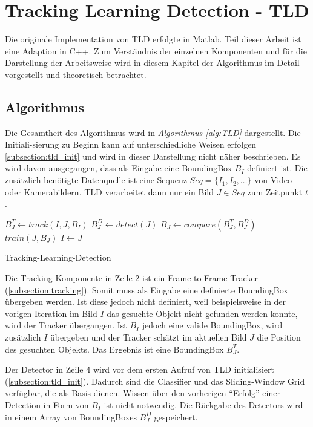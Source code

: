 \section{Tracking Learning Detection - TLD}
	\label{section_3}
	Die originale Implementation von TLD erfolgte in Matlab. Teil dieser Arbeit ist eine Adaption in C++. Zum Verständnis der einzelnen Komponenten und für die Darstellung der Arbeitsweise wird in diesem Kapitel der Algorithmus im Detail vorgestellt und theoretisch betrachtet.

	\subsection{Algorithmus}
	Die Gesamtheit des Algorithmus wird in {\em Algorithmus \ref{alg:TLD}} dargestellt. Die Initiali-sierung zu Beginn kann auf unterschiedliche Weisen erfolgen \ref{subsection:tld_init} und wird in dieser Darstellung nicht näher beschrieben. Es wird davon ausgegangen, dass als Eingabe eine BoundingBox $B_I$ definiert ist. Die zusätzlich benötigte Datenquelle ist eine Sequenz $Seq = \{I_1, I_2, \dots \}$ von Video- oder Kamerabildern. TLD verarbeitet dann nur ein Bild $J \in Seq$ zum Zeitpunkt $t$.

	\begin{algorithm}[H]
		\vspace{0.2cm}
		 {
			$B_J^T \leftarrow track(I,J,B_I)$\;
		}
		$B_J^D \leftarrow detect(J)$\;
		$B_J \leftarrow compare(B_J^T,B_J^D)$\;
		 {
			$train(J,B_J)$\;
		}
		$I \leftarrow J$\;
		\caption{Tracking-Learning-Detection}
		\label{alg:TLD}
		\vspace{0.2cm}
	\end{algorithm}
	Die Tracking-Komponente in Zeile 2 ist ein Frame-to-Frame-Tracker (\ref{subsection:tracking}). Somit muss als Eingabe eine definierte BoundingBox übergeben werden. Ist diese jedoch nicht definiert, weil beispielsweise in der vorigen Iteration im Bild $I$ das gesuchte Objekt nicht gefunden werden konnte, wird der Tracker übergangen. Ist $B_I$ jedoch eine valide BoundingBox, wird zusätzlich $I$ übergeben und der Tracker schätzt im aktuellen Bild $J$ die Position des gesuchten Objekts. Das Ergebnis ist eine BoundingBox $B_J^T$.

	Der Detector in Zeile 4 wird vor dem ersten Aufruf von TLD initialisiert (\ref{subsection:tld_init}). Dadurch sind die Classifier und das Sliding-Window Grid verfügbar, die als Basis dienen. Wissen über den vorherigen ``Erfolg'' einer Detection in Form von $B_I$ ist nicht notwendig. Die Rückgabe des Detectors wird in einem Array von BoundingBoxes $B_J^D$ gespeichert.

